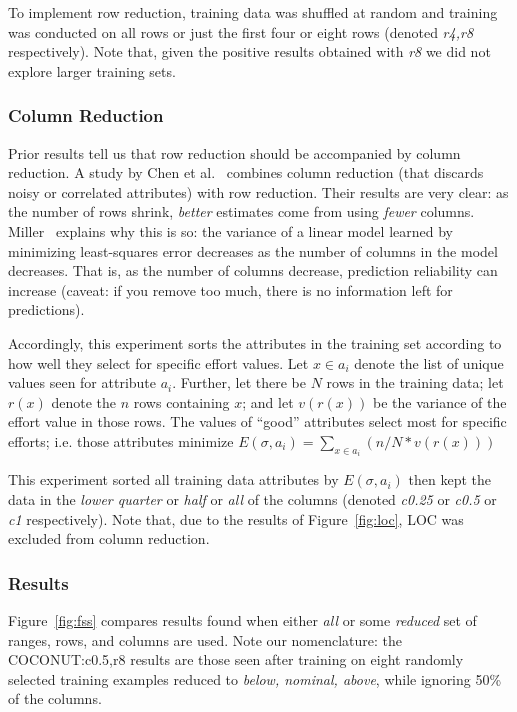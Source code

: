 \documentclass[smallcondesed]{svjour3}
\newcommand{\fig}[1]{Figure~\ref{fig:#1}}
\begin{document}
To implement  row reduction, training data was
shuffled at random and training was conducted on
all rows or  just the first four or eight  rows
(denoted {\em r4,r8} respectively). Note that, given  the positive
results obtained with {\em r8} we did not explore larger training sets.



\subsubsection{Column Reduction}\label{sect:pruner}

Prior results tell us that row reduction should be
accompanied by column reduction.  A study by Chen et
al.~\cite{chen05a} combines column reduction (that
discards noisy or correlated attributes) with row
reduction. Their results are very clear: as the
number of rows shrink, {\em better} estimates come
from using {\em fewer}
columns. Miller~\cite{miller02} explains  why this is so:  the variance of a
linear model learned by minimizing least-squares error decreases as the number of columns in the model
decreases. That is, as the number of columns decrease,
prediction reliability can increase (caveat: 
if you remove too much,
there is no information left for predictions).

Accordingly, this experiment sorts the attributes in the training set according
to how well they select for specific effort values. 
Let $x\in a_i$ denote the list of unique values seen for attribute $a_i$. Further,
let there be $N$ rows in the training data; 
let  $r(x)$ denote the $n$ rows containing $x$; and let $v(r(x))$ be the variance
of the effort value in those rows. The values of ``good'' attributes
select most for specific efforts; i.e. those attributes minimize
$E(\sigma,a_i) =\sum_{x\in a_i} \left(n/N * v(r(x))\right)$

This experiment sorted all training data attributes by $E(\sigma,a_i)$ then kept
the data in the {\em lower quarter} or  {\em half} or {\em all} of  the columns
(denoted {\em c0.25} or {\em c0.5} or {\em c1} respectively).
Note that, due to the results of \fig{loc}, LOC was excluded from column reduction.



\subsubsection{Results}

\fig{fss} compares results found when either
{\em all} or some {\em reduced} set of ranges, rows,
and columns are used. Note our nomenclature:  the
COCONUT:c0.5,r8  results are those
seen after training on eight randomly selected
training examples reduced to {\em below, nominal,
above}, while ignoring 50\% of the columns. 
\end{document}
